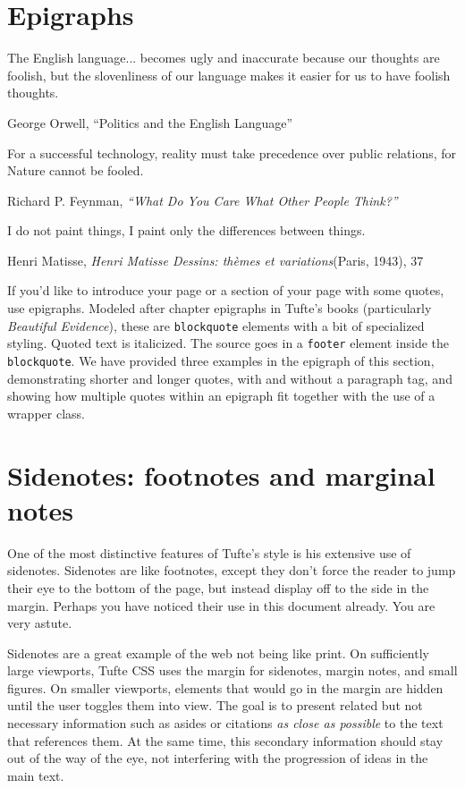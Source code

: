 \documentclass{article}
\begin{document}
\section{Epigraphs}

\begin{epigraphs}
\epigraph{The English language... becomes ugly and inaccurate because our thoughts are foolish, but the slovenliness of our language makes it easier for us to have foolish thoughts.}{George Orwell, ``Politics and the English Language''}

\epigraph{For a successful technology, reality must take precedence over public relations, for Nature cannot be fooled.}{Richard P. Feynman, \emph{``What Do You Care What Other People Think?''}}

\epigraph{I do not paint things, I paint only the differences between things.}{Henri Matisse, \emph{Henri Matisse Dessins: th\`{e}mes et variations}(Paris, 1943), 37}
\end{epigraphs}

If you’d like to introduce your page or a section of your page with some quotes, use epigraphs. Modeled after chapter epigraphs in Tufte’s books (particularly \emph{Beautiful Evidence}), these are \texttt{blockquote} elements with a bit of specialized styling. Quoted text is italicized. The source goes in a \texttt{footer} element inside the \texttt{blockquote}. We have provided three examples in the epigraph of this section, demonstrating shorter and longer quotes, with and without a paragraph tag, and showing how multiple quotes within an epigraph fit together with the use of a wrapper class.

\section{Sidenotes: footnotes and marginal notes}

One of the most distinctive features of Tufte’s style is his extensive use of sidenotes. Sidenotes are like footnotes, except they don’t force the reader to jump their eye to the bottom of the page, but instead display off to the side in the margin. Perhaps you have noticed their use in this document already. You are very astute.

Sidenotes are a great example of the web not being like print. On sufficiently large viewports, Tufte CSS uses the margin for sidenotes, margin notes, and small figures. On smaller viewports, elements that would go in the margin are hidden until the user toggles them into view. The goal is to present related but not necessary information such as asides or citations \emph{as close as possible} to the text that references them. At the same time, this secondary information should stay out of the way of the eye, not interfering with the progression of ideas in the main text.
\end{document}
